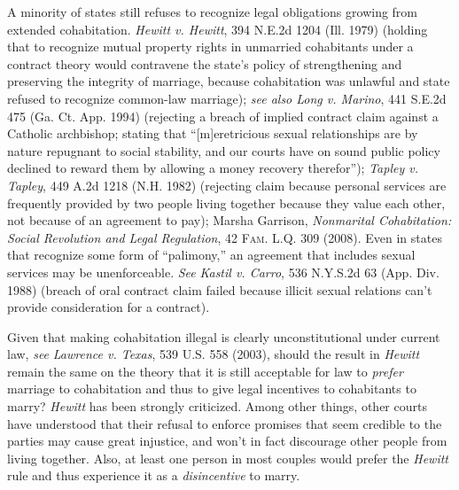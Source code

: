 \item
A minority of states still refuses to recognize legal obligations growing from
extended cohabitation. \emph{Hewitt v. Hewitt}, 394 N.E.2d 1204 (Ill. 1979)
(holding that to recognize mutual property rights in unmarried cohabitants under
a contract theory would contravene the state's policy of strengthening and
preserving the integrity of marriage, because cohabitation was unlawful and
state refused to recognize common-law marriage); \textit{see also Long v.
Marino}, 441 S.E.2d 475 (Ga. Ct. App. 1994) (rejecting a breach of implied
contract claim against a Catholic archbishop; stating that ``[m]eretricious
sexual relationships are by nature repugnant to social stability, and our courts
have on sound public policy declined to reward them by allowing a money recovery
therefor''); \emph{Tapley v. Tapley}, 449 A.2d 1218 (N.H. 1982) (rejecting claim
because personal services are frequently provided by two people living together
because they value each other, not because of an agreement to pay); Marsha
Garrison, \emph{Nonmarital Cohabitation: Social Revolution and Legal
Regulation}, 42 \textsc{Fam. L.Q.} 309 (2008). Even in states that recognize
some form of ``palimony,'' an agreement that includes sexual services may be
unenforceable. \textit{See} \emph{Kastil v. Carro}, 536 N.Y.S.2d 63 (App. Div.
1988) (breach of oral contract claim failed because illicit sexual relations
can't provide consideration for a contract).

\item
Given that making cohabitation illegal is clearly unconstitutional under current
law, \textit{see} \emph{Lawrence v. Texas}, 539 U.S. 558 (2003), should the
result in \textit{Hewitt} remain the same on the theory that it is still
acceptable for law to \textit{prefer} marriage to cohabitation and thus to give
legal incentives to cohabitants to marry? \textit{Hewitt} has been strongly
criticized. Among other things, other courts have understood that their refusal
to enforce promises that seem credible to the parties may cause great
injustice, and won't in fact discourage other people from living together.
Also, at least one person in most couples would prefer the \textit{Hewitt} rule
and thus experience it as a \textit{disincentive} to marry.

